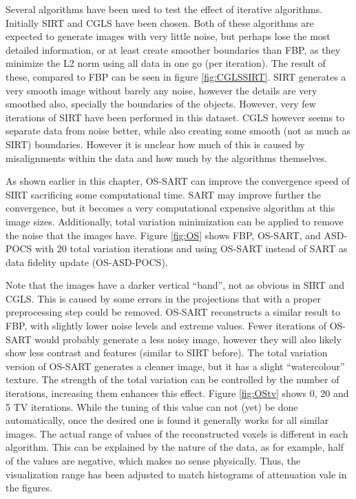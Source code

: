 Several algorithms have been used to test the effect of iterative algorithms.
Initially SIRT and CGLS have been chosen. Both of these algorithms are expected to generate images with very little noise, but perhaps lose the most detailed information, or at least create smoother boundaries than FBP, as they minimize the L2 norm using all data in one go (per iteration). The result of these, compared to FBP can be seen in figure \ref{fig:CGLSSIRT}. SIRT generates a very smooth image without barely any noise, however the details are very smoothed also, specially the boundaries of the objects. However, very few iterations of SIRT have been performed in this dataset. CGLS however seems to separate data from noise better, while also creating some smooth (not as much as SIRT) boundaries. However it is unclear how much of this is caused by misalignments within the data and how much by the algorithms themselves.

As shown earlier in this chapter, OS-SART can improve the convergence speed of SIRT sacrificing some computational time. SART may improve further the convergence, but it becomes a very computational expensive algorithm at this image sizes. Additionally, total variation minimization can be applied to remove the noise that the images have. Figure \ref{fig:OS} shows FBP, OS-SART, and ASD-POCS with 20 total variation iterations and using OS-SART instead of SART as data fidelity update (OS-ASD-POCS).

Note that the images have a darker vertical ``band'', not as obvious in SIRT and CGLS. This is caused by some errors in the projections that with a proper preprocessing step could be removed. OS-SART reconstructs a similar result to FBP, with slightly lower noise levels and extreme values. Fewer iterations of OS-SART would probably generate a less noisy image, however they will also likely show less contrast and features (similar to SIRT before). The total variation version of OS-SART generates a cleaner image, but it has a slight ``watercolour'' texture. The strength of the total variation can be controlled by the number of iterations, increasing them enhances this effect. Figure \ref{fig:OStv} shows 0, 20 and 5 TV iterations. While the tuning of this value can not (yet) be done automatically, once the desired one is found it generally works for all similar images. The actual range of values of the reconstructed voxels is different in each algorithm. This can be explained by the nature of the data, as for example, half of the values are negative, which makes no sense physically. Thus, the visualization range has been adjusted to match histograms of attenuation vale in the figures.


